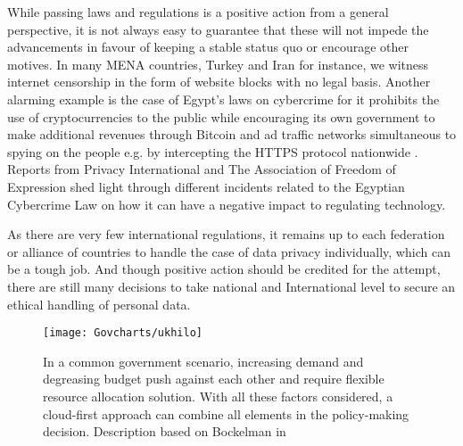 While passing laws and regulations is a positive action from a general perspective, it is not always easy to guarantee that these will not impede the advancements in favour of keeping a stable status quo or encourage other motives. In many MENA countries, Turkey and Iran for instance, we witness internet censorship in the form of website blocks with no legal basis. Another alarming example is the case of Egypt's laws on cybercrime for it prohibits the use of cryptocurrencies to the public while encouraging its own government to make additional revenues through Bitcoin and ad traffic networks simultaneous to spying on the people e.g. by intercepting the HTTPS protocol nationwide \cite{nilephish}. Reports from Privacy International \cite{pi:egypt} and The Association of Freedom of Expression \cite{afte:eg} shed light through different incidents related to the Egyptian Cybercrime Law on how it can have a negative impact to regulating technology. 

As there are very few international regulations, it remains up to each federation or alliance of countries to handle the case of data privacy individually, which can be a tough job. And though positive action should be credited for the attempt, there are still many decisions to take national and International level to secure an ethical handling of personal data.




\begin{figure}[H]
	\centering

	\caption[Policy-Making strategies]{In a common government scenario, increasing demand and degreasing budget push against each other and require flexible resource allocation solution. With all these factors considered, a cloud-first approach can combine all elements in the policy-making decision. Description based on Bockelman in \cite{aws:pubsecsum}}
	\label{aws:policymaking}
	\texttt{[image: Govcharts/ukhilo]} 
\end{figure}

